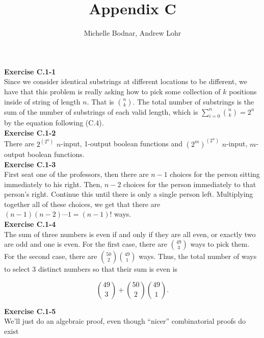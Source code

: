 \documentclass{article}
\title{Appendix C}
\author{Michelle Bodnar, Andrew Lohr}
\begin{document}
\maketitle

\noindent\textbf{Exercise C.1-1}\\

Since we consider identical substrings at different locations to be different, we have that this problem is really asking how to pick some collection of $k$ positions inside of string of length $n$. That is $\binom{n}{k}$. The total number of substrings is the sum of the number of substrings of each valid length, which is $\sum_{i=0}^n \binom{n}{k} = 2^n$ by the equation following (C.4).\\

\noindent\textbf{Exercise C.1-2}\\

There are $2^{(2^n)}$ $n$-input, 1-output boolean functions and $(2^m)^{(2^n)}$ $n$-input, $m$-output boolean functions. \\



\noindent\textbf{Exercise C.1-3}\\

First seat one of the professors, then there are $n-1$ choices for the person sitting immediately to his right. Then, $n-2$ choices for the person immediately to that person's right. Continue this until there is only a single person left. Multiplying together all of these choices, we get that there are $(n-1)(n-2)\cdots 1 = (n-1)!$ ways.\\



\noindent\textbf{Exercise C.1-4}\\

The sum of three numbers is even if and only if they are all even, or exactly two are odd and one is even.  For the first case, there are ${49 \choose 3}$ ways to pick them.  For the second case, there are ${50 \choose 2} {49 \choose 1}$ ways.  Thus, the total number of ways to select 3 distinct numbers so that their sum is even is 

\[ {49 \choose 3} + {50 \choose 2}{49 \choose 1}.\]



\noindent\textbf{Exercise C.1-5}\\

We'll just do an algebraic proof, even though ``nicer'' combinatorial proofs do exist
\end{document}
